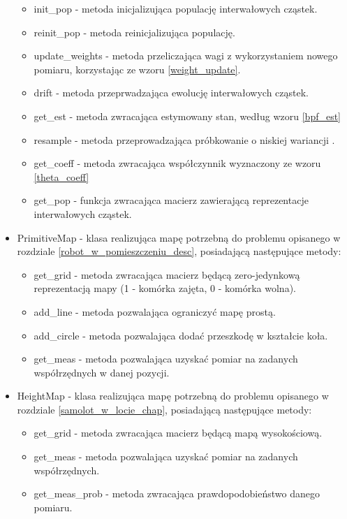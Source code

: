 \begin{itemize}
\begin{itemize}
		\item init\_pop - metoda inicjalizująca populację interwałowych cząstek.
		\item reinit\_pop - metoda reinicjalizująca populację.
		\item update\_weights - metoda przeliczająca wagi z wykorzystaniem nowego pomiaru, korzystając ze wzoru \ref{weight_update}.
		\item drift - metoda przeprwadzająca ewolucję interwałowych cząstek.
		\item get\_est - metoda zwracająca estymowany stan, według wzoru \ref{bpf_est}
		\item resample - metoda przeprowadzająca próbkowanie o niskiej wariancji \cite{sus_wiki}.
		\item get\_coeff - metoda zwracająca współczynnik wyznaczony ze wzoru \ref{theta_coeff}
		\item get\_pop - funkcja zwracająca macierz zawierającą reprezentacje interwałowych cząstek.
	\end{itemize}
	\item PrimitiveMap - klasa realizująca mapę potrzebną do problemu opisanego w rozdziale \ref{robot_w_pomieszczeniu_desc}, posiadającą następujące metody:
	\begin{itemize}
		\item get\_grid - metoda zwracająca macierz będącą zero-jedynkową reprezentacją mapy (1 - komórka zajęta, 0 - komórka wolna).
		\item add\_line - metoda pozwalająca ograniczyć mapę prostą.
		\item add\_circle - metoda pozwalająca dodać przeszkodę w kształcie koła.
		\item get\_meas - metoda pozwalająca uzyskać pomiar na zadanych współrzędnych w danej pozycji.
	\end{itemize}

	\item HeightMap - klasa realizująca mapę potrzebną do problemu opisanego w rozdziale \ref{samolot_w_locie_chap}, posiadającą następujące metody:
	\begin{itemize}
		\item get\_grid - metoda zwracająca macierz będącą mapą wysokościową.
		\item get\_meas - metoda pozwalająca uzyskać pomiar na zadanych współrzędnych.
		\item get\_meas\_prob - metoda zwracająca prawdopodobieństwo danego pomiaru.
	\end{itemize}
	
\end{itemize}
